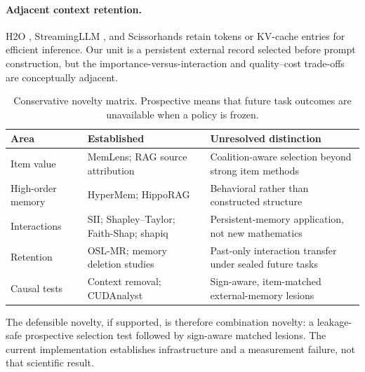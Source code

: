 \paragraph{Adjacent context retention.}
H2O \citep{zhang2023h2o}, StreamingLLM \citep{xiao2024streamingllm}, and
Scissorhands \citep{liu2023scissorhands} retain tokens or KV-cache entries for
efficient inference. Our unit is a persistent external record selected before prompt
construction, but the importance-versus-interaction and quality--cost trade-offs are
conceptually adjacent.

\begin{table}[t]
\caption{Conservative novelty matrix. Prospective means that future task outcomes
are unavailable when a policy is frozen.}
\label{tab:novelty}
\centering
\small
\begin{tabular}{@{}p{1.15in}p{1.50in}p{2.45in}@{}}
\toprule
Area & Established & Unresolved distinction \\
\midrule
Item value & MemLens; RAG source attribution & Coalition-aware selection beyond strong item methods \\
High-order memory & HyperMem; HippoRAG & Behavioral rather than constructed structure \\
Interactions & SII; Shapley--Taylor; Faith-Shap; shapiq & Persistent-memory application, not new mathematics \\
Retention & OSL-MR; memory deletion studies & Past-only interaction transfer under sealed future tasks \\
Causal tests & Context removal; CUDAnalyst & Sign-aware, item-matched external-memory lesions \\
\bottomrule
\end{tabular}
\end{table}

The defensible novelty, if supported, is therefore combination novelty: a
leakage-safe prospective selection test followed by sign-aware matched lesions. The
current implementation establishes infrastructure and a measurement failure, not
that scientific result.

